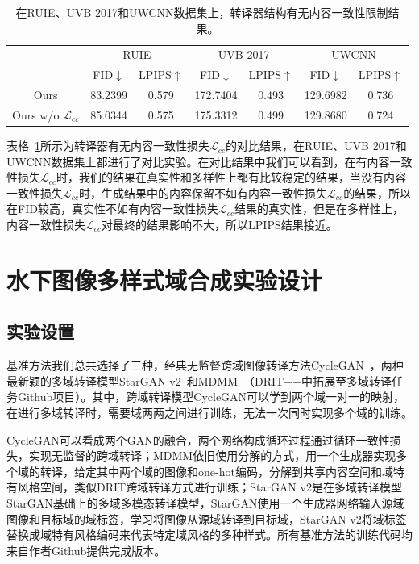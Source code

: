 \begin{table}[htbp]
  \centering
  \caption{在RUIE、UVB 2017和UWCNN数据集上，转译器结构有无内容一致性限制结果。}
    \begin{tabular}{c|c|c|c|c|c|c}
    \hline
    \multirow{2}[3]{*}{} & \multicolumn{2}{c|}{RUIE} & \multicolumn{2}{c|}{UVB 2017} & \multicolumn{2}{c}{UWCNN} \\
\cmidrule{2-7}          & \multicolumn{1}{c|}{FID$\downarrow$ } & \multicolumn{1}{c|}{LPIPS$\uparrow$} & \multicolumn{1}{c|}{FID$\downarrow$ } & \multicolumn{1}{c|}{LPIPS$\uparrow$} & \multicolumn{1}{c|}{FID$\downarrow$ } & LPIPS$\uparrow$ \\
    \midrule
    Ours  & 83.2399 & 0.579 & 172.7404 & 0.493 & 129.6982 & 0.736 \\
    Ours w/o $\mathcal{L}_{cc}$ & 85.0344 & 0.575 & 175.3312 & 0.499 & 129.8680 & 0.724 \\
    \hline
    \end{tabular}%
  \label{tab:ablation_modal_lcc}%
\end{table}%

表格~\ref{tab:ablation_modal_lcc}所示为转译器有无内容一致性损失$\mathcal{L}_{cc}$的对比结果，在RUIE、UVB 2017和UWCNN数据集上都进行了对比实验。在对比结果中我们可以看到，在有内容一致性损失$\mathcal{L}_{cc}$时，我们的结果在真实性和多样性上都有比较稳定的结果，当没有内容一致性损失$\mathcal{L}_{cc}$时，生成结果中的内容保留不如有内容一致性损失$\mathcal{L}_{cc}$的结果，所以在FID较高，真实性不如有内容一致性损失$\mathcal{L}_{cc}$结果的真实性，但是在多样性上，内容一致性损失$\mathcal{L}_{cc}$对最终的结果影响不大，所以LPIPS结果接近。

\section{水下图像多样式域合成实验设计}
\subsection{实验设置}
基准方法我们总共选择了三种，经典无监督跨域图像转译方法CycleGAN~\cite{zhu2017unpaired}，两种最新颖的多域转译模型StarGAN v2~\cite{choi2020stargan}和MDMM~\cite{lee2020drit++}（DRIT++中拓展至多域转译任务Github项目）。其中，跨域转译模型CycleGAN可以学到两个域一对一的映射，在进行多域转译时，需要域两两之间进行训练，无法一次同时实现多个域的训练。

CycleGAN可以看成两个GAN的融合，两个网络构成循环过程通过循环一致性损失，实现无监督的跨域转译；MDMM依旧使用分解的方式，用一个生成器实现多个域的转译，给定其中两个域的图像和one-hot编码，分解到共享内容空间和域特有风格空间，类似DRIT跨域转译方式进行训练；StarGAN v2是在多域转译模型StarGAN基础上的多域多模态转译模型，StarGAN使用一个生成器网络输入源域图像和目标域的域标签，学习将图像从源域转译到目标域，StarGAN v2将域标签替换成域特有风格编码来代表特定域风格的多种样式。所有基准方法的训练代码均来自作者Github提供完成版本。

